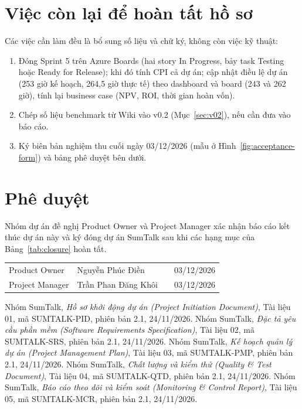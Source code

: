 \documentclass[12pt,a4paper]{report}
\begin{document}
\section{Việc còn lại để hoàn tất hồ sơ}
\label{sec:remaining}

Các việc cần làm đều là bổ sung số liệu và chữ ký, không còn việc kỹ thuật:
\begin{enumerate}
  \item Đóng Sprint 5 trên Azure Boards (hai story In Progress, bảy task Testing hoặc Ready for Release); khi đó
        tính CPI cả dự án; cập nhật điều lệ dự án~\cite{pid} (253 giờ kế hoạch, 264,5 giờ thực tế) theo dashboard và board (243 và 262 giờ), tính lại business case
        (NPV, ROI, thời gian hoàn vốn).
  \item Chép số liệu benchmark từ Wiki vào v0.2 (Mục~\ref{sec:v02}), nếu cần đưa vào báo cáo.
  \item Ký biên bản nghiệm thu cuối ngày 03/12/2026 (mẫu ở Hình~\ref{fig:acceptance-form}) và bảng phê duyệt bên dưới.
\end{enumerate}

\section{Phê duyệt}

Nhóm dự án đề nghị Product Owner và Project Manager xác nhận báo cáo kết thúc dự án này và ký đóng dự án SumTalk
sau khi các hạng mục của Bảng~\ref{tab:closure} hoàn tất.

\begin{table}[H]
  \centering
  \renewcommand{\arraystretch}{2.4}
  \begin{tabularx}{\linewidth}{@{}P{3.6cm}LP{3.2cm}P{2.6cm}@{}}
    \toprule
     &  &  &  \\
    \midrule
    Product Owner & Nguyễn Phúc Điền & & 03/12/2026 \\
    Project Manager & Trần Phan Đăng Khôi & & 03/12/2026 \\
    \bottomrule
  \end{tabularx}
\end{table}

\begin{thebibliography}{9}
   Nhóm SumTalk, \emph{Hồ sơ khởi động dự án (Project Initiation Document)}, Tài liệu 01,
    mã SUMTALK-PID, phiên bản 2.1, 24/11/2026.
   Nhóm SumTalk, \emph{Đặc tả yêu cầu phần mềm (Software Requirements Specification)},
    Tài liệu 02, mã SUMTALK-SRS, phiên bản 2.1, 24/11/2026.
   Nhóm SumTalk, \emph{Kế hoạch quản lý dự án (Project Management Plan)}, Tài liệu 03,
    mã SUMTALK-PMP, phiên bản 2.1, 24/11/2026.
   Nhóm SumTalk, \emph{Chất lượng và kiểm thử (Quality \& Test Document)}, Tài liệu 04,
    mã SUMTALK-QTD, phiên bản 2.1, 24/11/2026.
   Nhóm SumTalk, \emph{Báo cáo theo dõi và kiểm soát (Monitoring \& Control Report)}, Tài liệu 05,
    mã SUMTALK-MCR, phiên bản 2.1, 24/11/2026.
\end{thebibliography}
\end{document}

